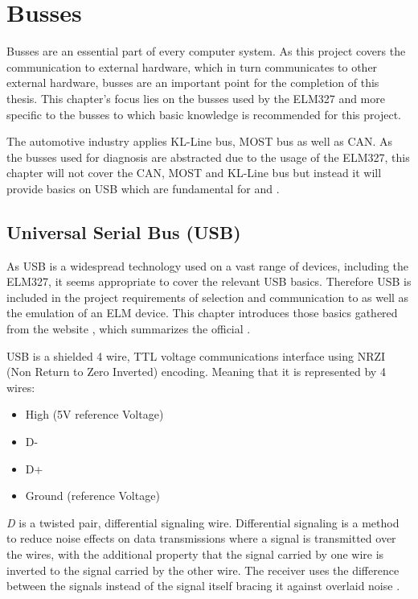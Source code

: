 \setcounter{section}{0}
\section{Busses}

Busses are an essential part of every computer system. As this project covers the communication to external hardware, which in turn communicates to other 
external hardware, busses are an important point for the completion of this thesis. This chapter’s focus lies on the busses used by the ELM327 and more 
specific to the busses to which basic knowledge is recommended for this project.

The automotive industry applies KL-Line bus, MOST bus as well as CAN. As the busses used for diagnosis are abstracted due to the usage of the ELM327, 
this chapter will not cover the CAN, MOST and KL-Line bus but instead it will provide basics on USB which are fundamental for  
and .

\subsection{Universal Serial Bus (USB)}
\label{sec:USB}
As USB is a widespread technology used on a vast range of devices, including the ELM327, it seems appropriate to cover the relevant USB basics.
Therefore USB is included in the project requirements of selection and communication to as well as the emulation of an ELM device. This chapter 
introduces those basics gathered from the website  \cite{USBNUT}, which summarizes the official  \cite[pp. 36ff., 199ff., 260-274]{USB}.


USB is a shielded 4 wire, TTL voltage communications interface using NRZI (Non Return to Zero Inverted) encoding. Meaning that it is represented by 4 wires:

\begin{itemize}
\item High (5V reference Voltage)
\item D-
\item D+
\item Ground (reference Voltage)
\end{itemize}

\emph{D} is a twisted pair, differential signaling wire. Differential signaling is a method to reduce noise effects on data transmissions where a signal
is transmitted over the wires, with the additional property that the signal carried by one wire is inverted to the signal carried by the other wire. The 
receiver uses the difference between the signals instead of the signal itself bracing it against overlaid noise \cite{Massoud2001}.

